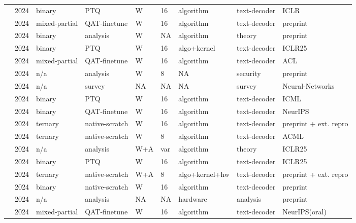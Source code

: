 \documentclass[11pt]{article}
\begin{document}
\begin{landscape}
\begin{longtable}{p{3.2cm} p{1cm} p{1.9cm} p{2.2cm} p{2.2cm} p{1.3cm} p{2.2cm} p{2.1cm} p{2.5cm}}
\citet{Chen2024-DBLLM} & 2024 & binary & PTQ & W & 16 & algorithm & text-decoder & ICLR \\
\citet{Chen2024-EfficientQAT} & 2024 & mixed-partial & QAT-finetune & W & 16 & algorithm & text-decoder & preprint \\
\citet{Daliri2024-Theory1bit} & 2024 & binary & analysis & W & NA & algorithm & theory & preprint \\
\citet{Dong2024-STBLLM} & 2024 & binary & PTQ & W & 16 & algo+\allowbreak{}kernel & text-decoder & ICLR25 \\
\citet{Du2024-BitDistiller} & 2024 & mixed-partial & QAT-finetune & W & 16 & algorithm & text-decoder & ACL \\
\citet{Das2024-GenBFA} & 2024 & n/\allowbreak{}a & analysis & W & 8 & NA & security & preprint \\
\citet{Gong2024-SurveyLowbit} & 2024 & n/\allowbreak{}a & survey & NA & NA & NA & survey & Neural-Networks \\
\citet{Huang2024-BiLLM} & 2024 & binary & PTQ & W & 16 & algorithm & text-decoder & ICML \\
\citet{Jo2024-BinaryMoS} & 2024 & binary & QAT-finetune & W & 16 & algorithm & text-decoder & Neur\allowbreak{}IPS \\
\citet{Kaushal2024-Spectra} & 2024 & ternary & native-scratch & W & 16 & algorithm & text-decoder & preprint +\allowbreak{} ext. repro \\
\citet{Zhao2024-DQT} & 2024 & ternary & native-scratch & W & 8 & algorithm & text-decoder & ACML \\
\citet{Kumar2024-ScalingLawsPrecision} & 2024 & n/\allowbreak{}a & analysis & W+\allowbreak{}A & var & algorithm & theory & ICLR25 \\
\citet{Li2024-ARBLLM} & 2024 & binary & PTQ & W & 16 & algorithm & text-decoder & ICLR25 \\
\citet{Ma2024-BitNetB158} & 2024 & ternary & native-scratch & W+\allowbreak{}A & 8 & algo+\allowbreak{}kernel+\allowbreak{}hw & text-decoder & preprint +\allowbreak{} ext. repro \\
\citet{Ma2024-FBILLM} & 2024 & binary & native-scratch & W & 16 & algorithm & text-decoder & preprint \\
\citet{Malekar2024-MatmulOrNot} & 2024 & n/\allowbreak{}a & analysis & NA & NA & hardware & analysis & preprint \\
\citet{Malinovskii2024-PVTuning} & 2024 & mixed-partial & QAT-finetune & W & 16 & algorithm & text-decoder & Neur\allowbreak{}IPS(oral) \\

\end{longtable}
\end{landscape}
\end{document}
